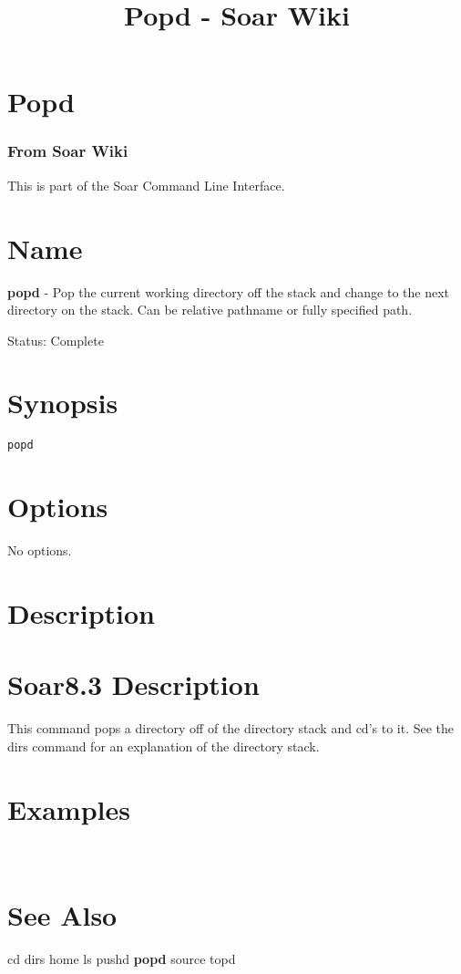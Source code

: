 \documentclass[10pt]{article}
\title{Popd - Soar Wiki}
\begin{document}
\section*{Popd}
\subsubsection*{From Soar Wiki}


 This is part of the Soar Command Line Interface. 
\section*{ Name }


 \textbf{popd}
 - Pop the current working directory off the stack and change to the next directory on the stack. Can be relative pathname or fully specified path. 


 Status: Complete
\section*{ Synopsis }
\begin{verbatim}
popd

\end{verbatim}
\section*{ Options }


 No options. 
\section*{ Description }
\section*{ Soar8.3 Description }


 This command pops a directory off of the directory stack and cd's to it. See the dirs command for an explanation of the directory stack. 
\section*{ Examples }


 \\ 

\section*{ See Also }
\begin{description}
cd dirs home ls pushd \textbf{popd}
 source topd

\end{description}
\end{document}
